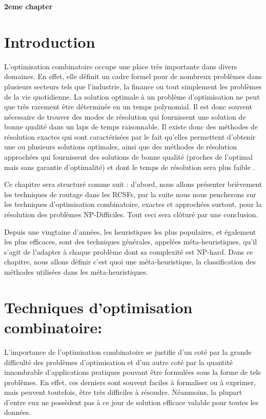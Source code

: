 \cleardoublepage


\setcounter{chapter}{2}
\setcounter{section}{0}
\setcounter{figure}{0}

\begin{center}
	\Huge\textbf{2eme chapter}
\end{center}

\section{Introduction}
L’optimisation combinatoire occupe une place très importante dans divers domaines. En effet, elle définit un cadre formel pour de nombreux problèmes dans plusieurs secteurs tels que l’industrie, la finance ou tout simplement les problèmes de la vie quotidienne.
La solution optimale à un problème d’optimisation ne peut que très rarement être déterminée en un temps polynomial. Il est donc souvent nécessaire de trouver des modes de résolution qui fournissent une solution de bonne qualité dans un laps de temps raisonnable. Il existe donc des méthodes de résolution exactes qui sont caractérisées par le fait qu’elles permettent d’obtenir une ou plusieurs solutions optimales, ainsi que des méthodes de résolution approchées qui fournissent des solutions de bonne qualité (proches de l’optimal mais sans garantie d’optimalité) et dont le temps de résolution sera plus faible \cite{zidi2006systeme}.

Ce chapitre sera structuré comme suit : d’abord, nous allons présenter brièvement les techniques de routage dans les RCSFs, par la suite nous nous pencherons sur les techniques d’optimisation combinatoire, exactes et approchées surtout, pour la résolution des problèmes NP-Difficiles. Tout ceci sera clôturé par une conclusion.

Depuis une vingtaine d’années, les heuristiques les plus populaires, et également les plus efficaces, sont des techniques générales, appelées méta-heuristiques, qu’il s’agit de l’adapter à chaque problème dont sa complexité est NP-hard. Dans ce chapitre, nous allons définir c’est quoi une méta-heuristique, la classification des méthodes utilisées dans les méta-heuristiques. 

\section{Techniques d’optimisation combinatoire:}
L’importance de l’optimisation combinatoire se justifie d’un coté par la grande difficulté des problèmes d’optimisation et d’un autre coté par la quantité innombrable d’applications pratiques pouvant être formulées sous la forme de tels problèmes. En effet, ces derniers sont souvent faciles à formaliser ou à exprimer, mais peuvent toutefois, être très difficiles à résoudre. Néanmoins, la plupart d’entre eux ne possèdent pas à ce jour de solution efficace valable pour toutes les données. \cite{hao1999metaheuristiques}

